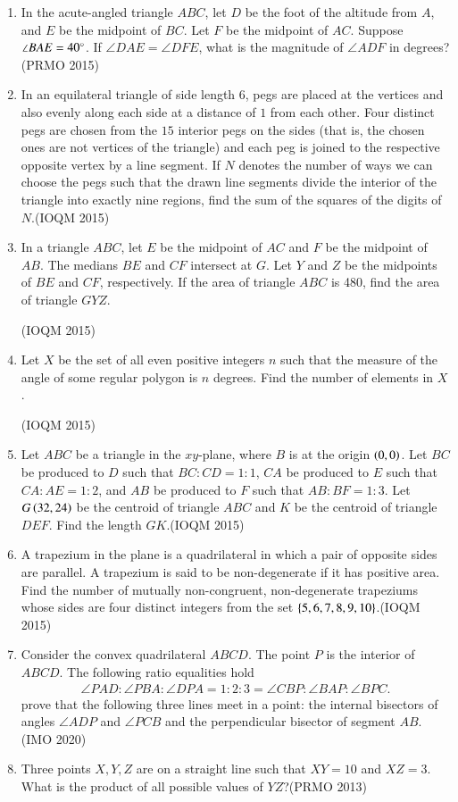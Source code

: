\begin{enumerate}[label=\thesubsection.\arabic*,ref=\thesubsection.\theenumi]
\item In the acute-angled triangle $ABC$, let $D$ be the foot of the altitude from $A$, and $E$ be the midpoint of $BC$. Let $F$ be the midpoint of $AC$. Suppose $ \angle BAE = 40\degree $. If $ \angle DAE = \angle DFE $, what is the magnitude of $ \angle ADF $ in degrees?
	\hfill(PRMO 2015)
	\item In an equilateral triangle of side length $6$, pegs are placed at the vertices and also evenly along each side at a distance of $1$ from each other. Four distinct pegs are chosen from the $15$ interior pegs on the sides (that is, the chosen ones are not vertices of the triangle) and each peg is joined to the respective opposite vertex by a line segment. If $N$ denotes the number of ways we can choose the pegs such that the drawn line segments divide the interior of the triangle into exactly nine regions, find the sum of the squares of the digits of $N$.\hfill(IOQM 2015)		
	\item In a triangle $ABC$, let $E$ be the midpoint of $AC$ and $F$ be the midpoint of $AB$. The medians $BE$ and $CF$ intersect at $G$. Let $Y$ and $Z$ be the midpoints of $BE$ and $CF$, respectively. If the area of triangle $ABC$ is 480, find the area of triangle $GYZ$.

		\hfill(IOQM 2015)
    \item Let $X$ be the set of all even positive integers $n$ such that the measure of the angle of some regular polygon is $n$ degrees. Find the number of elements in $X$.

	    \hfill(IOQM 2015)
    \item Let $ABC$ be a triangle in the $xy$-plane, where $B$ is at the origin $\left(0, 0\right)$. Let $BC$ be produced to $D$ such that $BC : CD = 1 : 1$, $CA$ be produced to $E$ such that $CA : AE = 1 : 2$, and $AB$ be produced to $F$ such that $AB : BF = 1 : 3$. Let $G\left(32, 24\right)$ be the centroid of triangle $ABC$ and $K$ be the centroid of triangle $DEF$. Find the length $GK$.\hfill(IOQM 2015)
    \item A trapezium in the plane is a quadrilateral in which a pair of opposite sides are parallel. A trapezium is said to be non-degenerate if it has positive area. Find the number of mutually non-congruent, non-degenerate trapeziums whose sides are four distinct integers from the set $\left\{5, 6, 7, 8, 9, 10\right\}$.\hfill(IOQM 2015)
    
\item Consider the convex quadrilateral $ABCD$. The point $P$ is the interior of $ABCD$. The following ratio equalities hold
\begin{align*}
\angle PAD: \angle PBA: \angle DPA =1:2:3 = \angle CBP: \angle BAP: \angle BPC.
\end{align*} 
prove
 that the following three lines meet in a point: the internal bisectors 
of angles $\angle ADP$ and $\angle PCB$ and the perpendicular bisector 
of segment $AB$.
\hfill(IMO 2020)
\item Three points $ X, Y, Z $ are on a straight line such that $ XY = 10 $ and $ XZ = 3 $. What is the product of all possible values of $ YZ $?\hfill(PRMO 2013)


\end{enumerate}
